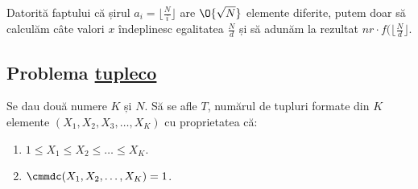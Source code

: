 Datorită faptului că șirul $a_i = \lfloor \frac{N}{i} \rfloor$ are $\O{\sqrt{N}}$ elemente diferite, putem doar să calculăm câte valori $x$ îndeplinesc egalitatea $\frac{N}{d}$ și să adunăm la rezultat $nr \cdot f(\lfloor \frac{N}{d} \rfloor$.

\subsection{Problema \href{https://kilonova.ro/problems/1820}{tupleco}}
Se dau două numere $K$ și $N$. Să se afle $T$, numărul de tupluri formate din $K$ elemente $(X_1, X_2, X_3, \dots , X_K)$ cu proprietatea că:
\begin{enumerate}
    \item $1 \leq X_1 \leq X_2 \leq \dots \leq X_K$.
    \item $\cmmdc(X_1, X_2, \dots, X_K) = 1$.
\end{enumerate}

